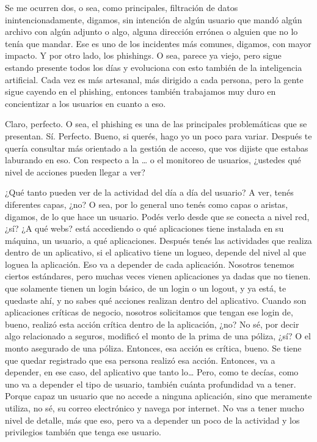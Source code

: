 \begin{description}[leftmargin=0cm, labelsep=0.5cm]
    \item[\textbf{JACUBOVICH LUCIANA:}] Se me ocurren dos, o sea, como principales, filtración de datos inintencionadamente, digamos, sin intención de algún usuario que mandó algún archivo con algún adjunto o algo, alguna dirección errónea o alguien que no lo tenía que mandar. Ese es uno de los incidentes más comunes, digamos, con mayor impacto. Y por otro lado, los phishings. O sea, parece ya viejo, pero sigue estando presente todos los días y evoluciona con esto también de la inteligencia artificial. Cada vez es más artesanal, más dirigido a cada persona, pero la gente sigue cayendo en el phishing, entonces también trabajamos muy duro en concientizar a los usuarios en cuanto a eso.

    \item[\textbf{MOCIULSKY SANTIAGO:}] Claro, perfecto. O sea, el phishing es una de las principales problemáticas que se presentan. Sí. Perfecto. Bueno, si querés, hago yo un poco para variar. Después te quería consultar más orientado a la gestión de acceso, que vos dijiste que estabas laburando en eso. Con respecto a la … o el monitoreo de usuarios, ¿ustedes qué nivel de acciones pueden llegar a ver?

    \item[\textbf{JACUBOVICH LUCIANA:}] ¿Qué tanto pueden ver de la actividad del día a día del usuario? A ver, tenés diferentes capas, ¿no? O sea, por lo general uno tenés como capas o aristas, digamos, de lo que hace un usuario. Podés verlo desde que se conecta a nivel red, ¿sí? ¿A qué webs? está accediendo o qué aplicaciones tiene instalada en su máquina, un usuario, a qué aplicaciones. Después tenés las actividades que realiza dentro de un aplicativo, si el aplicativo tiene un logueo, depende del nivel al que loguea la aplicación. Eso va a depender de cada aplicación. Nosotros tenemos ciertos estándares, pero muchas veces vienen aplicaciones ya dadas que no tienen. que solamente tienen un login básico, de un login o un logout, y ya está, te quedaste ahí, y no sabes qué acciones realizan dentro del aplicativo. Cuando son aplicaciones críticas de negocio, nosotros solicitamos que tengan ese login de, bueno, realizó esta acción crítica dentro de la aplicación, ¿no? No sé, por decir algo relacionado a seguros, modificó el monto de la prima de una póliza, ¿sí? O el monto asegurado de una póliza. Entonces, esa acción es crítica, bueno. Se tiene que quedar registrado que esa persona realizó esa acción. Entonces, va a depender, en ese caso, del aplicativo que tanto lo… Pero, como te decías, como uno va a depender el tipo de usuario, también cuánta profundidad va a tener. Porque capaz un usuario que no accede a ninguna aplicación, sino que meramente utiliza, no sé, su correo electrónico y navega por internet. No vas a tener mucho nivel de detalle, más que eso, pero va a depender un poco de la actividad y los privilegios también que tenga ese usuario.


\end{description}
